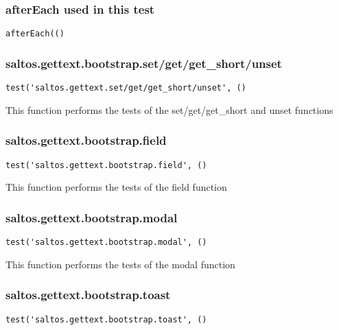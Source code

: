\documentclass[a4paper]{article}
\begin{document}
\hypertarget{toc618}{}
\subsubsection{afterEach used in this test}

\begin{lstlisting}
afterEach(()
\end{lstlisting}

\hypertarget{toc619}{}
\subsubsection{saltos.gettext.bootstrap.set/get/get\_short/unset}

\begin{lstlisting}
test('saltos.gettext.set/get/get_short/unset', ()
\end{lstlisting}

This function performs the tests of the set/get/get\_short and unset functions

\hypertarget{toc620}{}
\subsubsection{saltos.gettext.bootstrap.field}

\begin{lstlisting}
test('saltos.gettext.bootstrap.field', ()
\end{lstlisting}

This function performs the tests of the field function

\hypertarget{toc621}{}
\subsubsection{saltos.gettext.bootstrap.modal}

\begin{lstlisting}
test('saltos.gettext.bootstrap.modal', ()
\end{lstlisting}

This function performs the tests of the modal function

\hypertarget{toc622}{}
\subsubsection{saltos.gettext.bootstrap.toast}

\begin{lstlisting}
test('saltos.gettext.bootstrap.toast', ()
\end{lstlisting}
\end{document}

